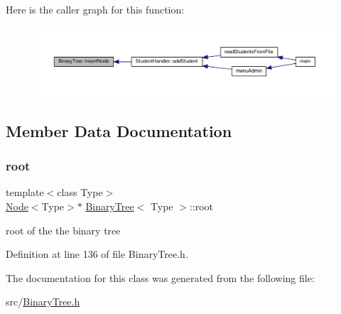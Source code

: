 Here is the caller graph for this function\+:
\nopagebreak
\begin{figure}[H]
\begin{center}
\leavevmode
\includegraphics[width=350pt]{class_binary_tree_a69ae782d438253d40cbd194737feca17_icgraph}
\end{center}
\end{figure}


\subsection{Member Data Documentation}
\mbox{\label{class_binary_tree_a8744322abfc99966f7d23d8560ed5702}} 
\subsubsection{\texorpdfstring{root}{root}}
{\footnotesize\ttfamily template$<$class Type$>$ \\
\hyperlink{class_node}{Node}$<$Type$>$$\ast$ \hyperlink{class_binary_tree}{Binary\+Tree}$<$ Type $>$\+::root\hspace{0.3cm}{\ttfamily [private]}}

root of the the binary tree 

Definition at line 136 of file Binary\+Tree.\+h.



The documentation for this class was generated from the following file\+:\begin{DoxyCompactItemize}
\item 
src/\hyperlink{_binary_tree_8h}{Binary\+Tree.\+h}\end{DoxyCompactItemize}
